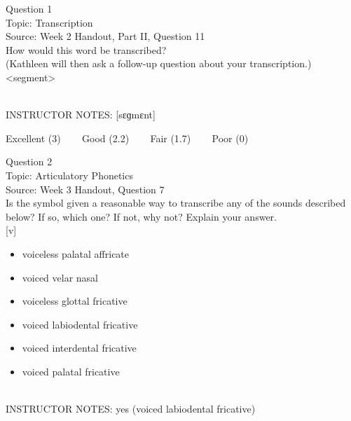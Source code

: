 \documentclass[12pt]{article}
\begin{document}
\begin{center}
\textbf{{\color{blue}{\HUGE START OF EXAM\\}}}

\textbf{{\color{blue}{\HUGE Student ID: 22413\\}}}

\textbf{{\color{blue}{\HUGE \\}}}

\end{center}
\newpage

{\large Question 1}\\

Topic: Transcription\\
Source: Week 2 Handout, Part II, Question 11\\

How would this word be transcribed?\\ (Kathleen will then ask a follow-up question about your transcription.)\\

<segment>


~\\
INSTRUCTOR NOTES: [sɛɡmɛnt]


\vfill
Excellent (3) ~~~ Good (2.2) ~~~ Fair (1.7) ~~~ Poor (0)
\newpage

{\large Question 2}\\

Topic: Articulatory Phonetics\\
Source: Week 3 Handout, Question 7\\

Is the symbol given a reasonable way to transcribe any of the sounds described below? If so, which one? If not, why not? Explain your answer.\\

{[v]}

\begin{itemize} \item voiceless palatal affricate \item voiced velar nasal \item voiceless glottal fricative \item voiced labiodental fricative \item voiced interdental fricative \item voiced palatal fricative \end{itemize}


~\\
INSTRUCTOR NOTES: yes (voiced labiodental fricative)
\end{document}
